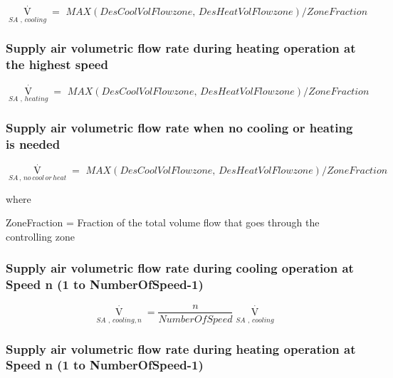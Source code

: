 \begin{equation}
{\mathop V\limits^ \cdot_{SA\,\,,\,cooling}} = \,\,MAX(DesCoolVolFlowzone,\,DesHeatVolFlowzone)/ZoneFraction
\end{equation}

\subsubsection{Supply air volumetric flow rate during heating operation at the highest speed}\label{supply-air-volumetric-flow-rate-during-heating-operation-at-the-highest-speed}

\begin{equation}
{\mathop V\limits^ \cdot_{SA\,\,,\,heating}} = \,\,MAX(DesCoolVolFlowzone,\,DesHeatVolFlowzone)/ZoneFraction
\end{equation}

\subsubsection{Supply air volumetric flow rate when no cooling or heating is needed}\label{supply-air-volumetric-flow-rate-when-no-cooling-or-heating-is-needed-1}

\begin{equation}
{\mathop V\limits^ \cdot_{SA\,,\,no\,cool\,or\,heat}} = \,\,MAX(DesCoolVolFlowzone,\,DesHeatVolFlowzone)/ZoneFraction
\end{equation}

where

ZoneFraction = Fraction of the total volume flow that goes through the controlling zone

\subsubsection{Supply air volumetric flow rate during cooling operation at Speed n (1 to NumberOfSpeed-1)}\label{supply-air-volumetric-flow-rate-during-cooling-operation-at-speed-n-1-to-numberofspeed-1}

\begin{equation}
{\mathop V\limits^ \cdot_{SA\,\,,\,cooling,n}} = \frac{n}{{NumberOfSpeed}}{\mathop V\limits^ \cdot_{SA\,\,,\,cooling}}
\end{equation}

\subsubsection{Supply air volumetric flow rate during heating operation at Speed n (1 to NumberOfSpeed-1)}\label{supply-air-volumetric-flow-rate-during-heating-operation-at-speed-n-1-to-numberofspeed-1}

